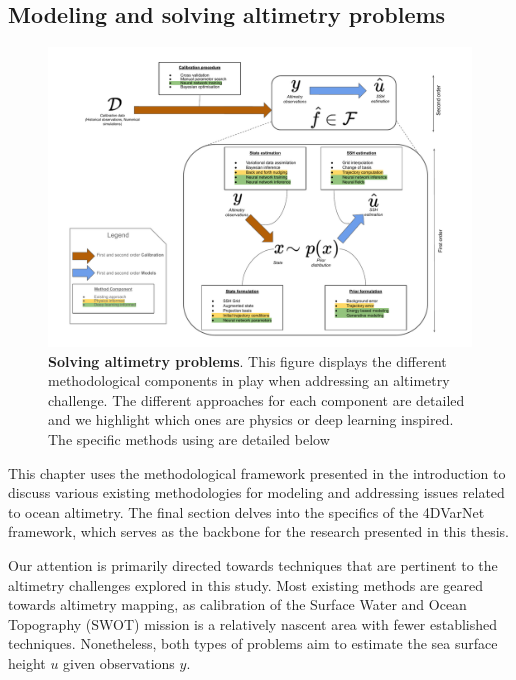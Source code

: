 \begin{bibunit}

  \chapter*{Modeling and solving altimetry problems}
  
\begin{figure}[h]
    \centering
    \includegraphics[width=\textwidth]{00_LitReview/Methodology.pdf}
    \caption{\textbf{Solving altimetry problems}. This figure displays the different methodological components in play when addressing an altimetry challenge. The different approaches for each component are detailed and we highlight which ones are physics or deep learning inspired. The specific methods using are detailed below}
    \label{c2fig:method}
\end{figure}

This chapter uses the methodological framework presented in the introduction to discuss various existing methodologies for modeling and addressing issues related to ocean altimetry. The final section delves into the specifics of the 4DVarNet framework, which serves as the backbone for the research presented in this thesis.



Our attention is primarily directed towards techniques that are pertinent to the altimetry challenges explored in this study. Most existing methods are geared towards altimetry mapping, as calibration of the Surface Water and Ocean Topography (SWOT) mission is a relatively nascent area with fewer established techniques. Nonetheless, both types of problems aim to estimate the sea surface height $u$ given observations $y$.




\end{bibunit}

